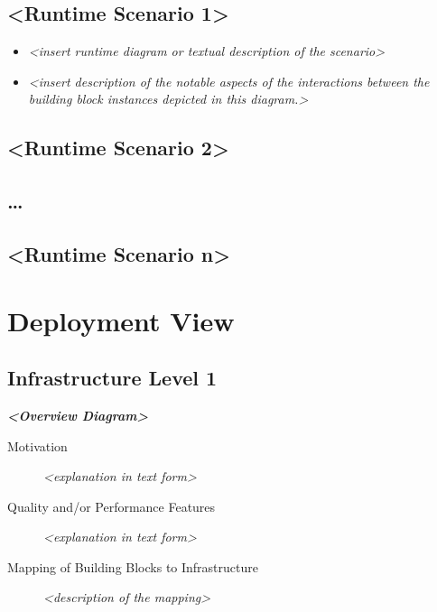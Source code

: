 \documentclass[]{article}
\begin{document}
\subsection{\textless{}Runtime Scenario
1\textgreater{}}\label{__runtime_scenario_1}

\begin{itemize}
\item
  \emph{\textless{}insert runtime diagram or textual description of the
  scenario\textgreater{}}
\item
  \emph{\textless{}insert description of the notable aspects of the
  interactions between the building block instances depicted in this
  diagram.\textgreater{}}
\end{itemize}

\subsection{\textless{}Runtime Scenario
2\textgreater{}}\label{__runtime_scenario_2}

\subsection{\ldots{}}\label{_}

\subsection{\textless{}Runtime Scenario
n\textgreater{}}\label{__runtime_scenario_n}

\section{Deployment View}\label{section-deployment-view}

\subsection{Infrastructure Level 1}\label{_infrastructure_level_1}

\emph{\textbf{\textless{}Overview Diagram\textgreater{}}}

\begin{description}
\item[Motivation]
\emph{\textless{}explanation in text form\textgreater{}}
\item[Quality and/or Performance Features]
\emph{\textless{}explanation in text form\textgreater{}}
\item[Mapping of Building Blocks to Infrastructure]
\emph{\textless{}description of the mapping\textgreater{}}
\end{description}
\end{document}
